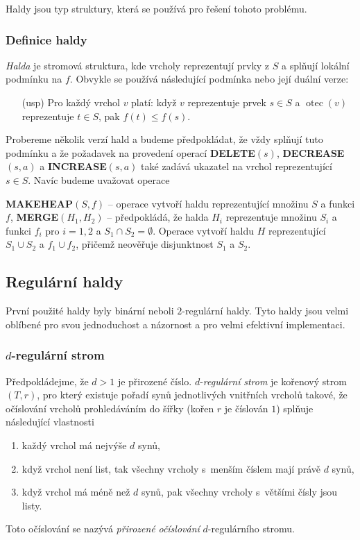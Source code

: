 \documentclass[a4paper,12pt]{article}
\DeclareMathOperator*{\otec}{otec}
\begin{document}
Haldy jsou typ 
struktury, která se používá pro řešení tohoto problému. 

\subsubsection{Definice haldy}

\emph{Halda} je stromová struktura, kde vrcholy 
reprezentují prvky z $S$ a splňují lokální podmínku na 
$f$. Obvykle se používá následující podmínka nebo její 
duální verze:

\begin{enumerate}
\item[(usp)]
Pro každý vrchol $v$ platí: když $v$ reprezentuje prvek 
$s\in S$ a $\otec(v)$ reprezentuje $t\in S$, pak $f(t)\le f(s)$.
\end{enumerate}

Probereme několik verzí hald a budeme 
předpokládat, že vždy splňují tuto podmínku a že požadavek na 
provedení operací {\bf DELETE$(s)$}, {\bf DECREA\-SE$(s,a
)$} a {\bf INCREASE$(s,a)$ }
také zadává ukazatel na vrchol repre\-zentující $s\in 
S$.  Navíc budeme 
uvažovat operace

{\bf MAKEHEAP$(S,f)$} -- operace vytvoří haldu 
reprezentující množinu $S$ a funkci $f$,\newline 
{\bf MERGE$(H_1,H_2)$} -- předpokládá, že halda $H_i$ reprezentuje 
množinu $S_i$ a funkci $f_i$ pro $i=1,2$ a $S_1\cap S_2=\emptyset$. Operace 
vytvoří haldu $H$ reprezentující $S_1\cup S_2$ a $
f_1\cup f_2$, 
přičemž neověřuje disjunktnost $S_1$ a $S_2$.

\subsection{{Regulární haldy}}

První použité haldy byly binární neboli $
2$-regulární haldy. 
Tyto haldy jsou velmi oblíbené pro svou jednoduchost a 
názornost a pro velmi efektivní implementaci.

\subsubsection{$d$-regulární strom}

Předpokládejme, že $d>1$ je přirozené číslo. 
$d$-\emph{regulární} \emph{strom} je kořenový strom 
$(T,r)$, pro který existuje pořadí synů 
jednotlivých vnitřních vrcholů takové, že 
očíslování vrcholů pro\-hle\-dá\-váním do šířky 
(kořen $r$ je číslován $1$) splňuje následující vlastnosti
\begin{enumerate}
\item
každý vrchol má nejvýše $d$ synů,
\item
když vrchol není list, tak všechny vrcholy s~menším 
číslem mají právě $d$ synů,
\item
když vrchol má méně než $d$ synů, pak všechny 
vrcholy s~většími čísly jsou listy.
\end{enumerate}
Toto očíslování se nazývá \emph{přirozené} 
\emph{očíslování} $d$-regulárního stromu. 
\end{document}
